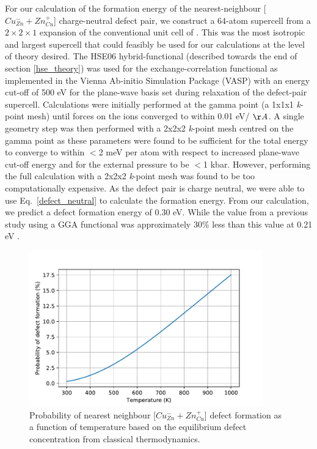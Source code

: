 \documentclass[11pt, twoside]{report}
\begin{document}
For our calculation of the formation energy of the nearest-neighbour [$Cu_{Zn}^- + Zn_{Cu}^+$] charge-neutral defect pair, we construct a 64-atom supercell from a $2\times2\times1$ expansion of the conventional unit cell of {\CZTS}. This was the most isotropic and largest supercell that could feasibly be used for our calculations at the level of theory desired.
The HSE06 hybrid-functional \cite{HSE} (described towards the end of section \ref{hse_theory}) was used for the exchange-correlation functional as implemented in the Vienna Ab-initio Simulation Package (VASP) \cite{VASP} with an energy cut-off of 500 eV for the plane-wave basis set during relaxation of the defect-pair supercell. Calculations were initially performed at the gamma point (a 1x1x1 \textit{k}-point mesh) until forces on the ions converged to within 0.01 eV/ $\AA$. 
A single geometry step was then performed with a 2x2x2 \textit{k}-point mesh centred on the gamma point as these parameters were found to be sufficient for the total energy to converge to within $<$2 meV per atom with respect to increased plane-wave cut-off energy and for the external pressure to be $<$1 kbar. However, performing the full calculation with a 2x2x2 \textit{k}-point mesh was found to be too computationally expensive. 
As the defect pair is charge neutral, we were able to use Eq.~\ref{defect_neutral} to calculate the formation energy. From our calculation, we predict a defect formation energy of 0.30 eV. While the value from a previous study using a GGA functional was approximately 30\% less than this value at 0.21 eV \cite{defects_Chen}.

\begin{figure}[h!]
  \centering
    \includegraphics[width=0.9\textwidth]{figures/CZTS_Cu-Zn_defect_conc.pdf}
    \caption{Probability of nearest neighbour [$Cu_{Zn}^- + Zn_{Cu}^+$] defect formation as a function of temperature based on the equilibrium defect concentration from classical thermodynamics.}
  \label{Cu-Zn_eqm_conc}
\end{figure}
\end{document}
